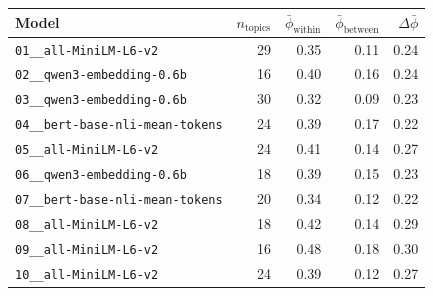 \begin{tabular}{lrrrr}
\toprule
Model & $n_{\mathrm{topics}}$ & $\bar{\phi}_{\mathrm{within}}$ & $\bar{\phi}_{\mathrm{between}}$ & $\Delta\bar{\phi}$ \\
\midrule
\texttt{01\_\_all-MiniLM-L6-v2} & 29 & 0.35 & 0.11 & 0.24 \\
\texttt{02\_\_qwen3-embedding-0.6b} & 16 & 0.40 & 0.16 & 0.24 \\
\texttt{03\_\_qwen3-embedding-0.6b} & 30 & 0.32 & 0.09 & 0.23 \\
\texttt{04\_\_bert-base-nli-mean-tokens} & 24 & 0.39 & 0.17 & 0.22 \\
\texttt{05\_\_all-MiniLM-L6-v2} & 24 & 0.41 & 0.14 & 0.27 \\
\texttt{06\_\_qwen3-embedding-0.6b} & 18 & 0.39 & 0.15 & 0.23 \\
\texttt{07\_\_bert-base-nli-mean-tokens} & 20 & 0.34 & 0.12 & 0.22 \\
\texttt{08\_\_all-MiniLM-L6-v2} & 18 & 0.42 & 0.14 & 0.29 \\
\texttt{09\_\_all-MiniLM-L6-v2} & 16 & 0.48 & 0.18 & 0.30 \\
\texttt{10\_\_all-MiniLM-L6-v2} & 24 & 0.39 & 0.12 & 0.27 \\
\bottomrule
\end{tabular}
